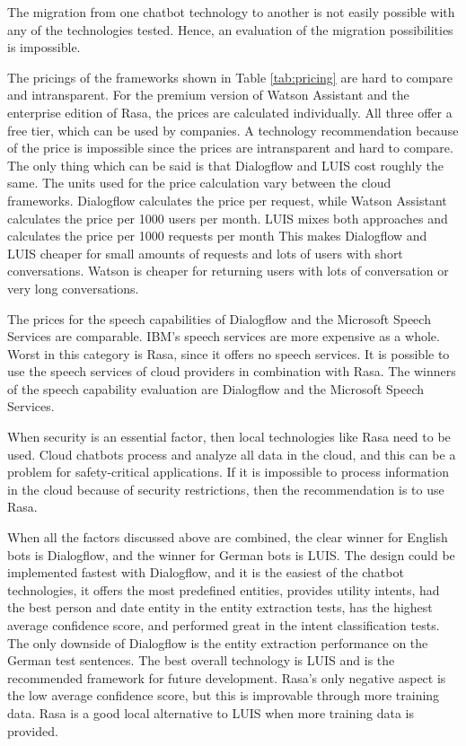 The migration from one chatbot technology to another is not easily possible with any of the technologies tested. 
Hence, an evaluation of the migration possibilities is impossible.

The pricings of the frameworks shown in Table \ref{tab:pricing} are hard to compare and intransparent.
For the premium version of Watson Assistant and the enterprise edition of Rasa, the prices are calculated individually.
All three offer a free tier, which can be used by companies.
A technology recommendation because of the price is impossible since the prices are intransparent and hard to compare.
The only thing which can be said is that Dialogflow and LUIS cost roughly the same.
The units used for the price calculation vary between the cloud frameworks.
Dialogflow calculates the price per request, while Watson Assistant calculates the price per 1000 users per month.
LUIS mixes both approaches and calculates the price per 1000 requests per month
This makes Dialogflow and LUIS cheaper for small amounts of requests and lots of users with short conversations.
Watson is cheaper for returning users with lots of conversation or very long conversations.

The prices for the speech capabilities of Dialogflow and the Microsoft Speech Services are comparable.
IBM's speech services are more expensive as a whole.
Worst in this category is Rasa, since it offers no speech services.
It is possible to use the speech services of cloud providers in combination with Rasa.
The winners of the speech capability evaluation are Dialogflow and the Microsoft Speech Services.

When security is an essential factor, then local technologies like Rasa need to be used.
Cloud chatbots process and analyze all data in the cloud, and this can be a problem for safety-critical applications.
If it is impossible to process information in the cloud because of security restrictions, then the recommendation is to use Rasa.

When all the factors discussed above are combined, the clear winner for English bots is Dialogflow, and the winner for German bots is LUIS.
The design could be implemented fastest with Dialogflow, and it is the easiest of the chatbot technologies,
it offers the most predefined entities, provides utility intents, had the best person and date entity in the entity extraction tests, has the highest average confidence score, and performed great in the intent classification tests.
The only downside of Dialogflow is the entity extraction performance on the German test sentences.
The best overall technology is LUIS and is the recommended framework for future development.
Rasa's only negative aspect is the low average confidence score, but this is improvable through more training data.
Rasa is a good local alternative to LUIS when more training data is provided.

